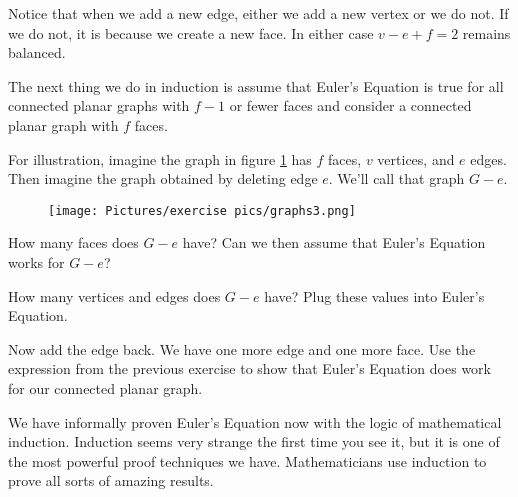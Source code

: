 \vspace{1in}

\noindent Notice that when we add a new edge, either we add a new vertex or we do not. If we do not, it is because we create a new face. In either case $v - e + f = 2$ remains balanced. 

\noindent The next thing we do in induction is assume that Euler’s Equation is true for all connected planar graphs with $f-1$ or fewer faces and consider a connected planar graph with $f$ faces.

\noindent For illustration, imagine the graph in figure \ref{graph3} has $f$ faces, $v$ vertices, and $e$ edges. Then imagine the graph obtained by deleting edge $e$. We’ll call that graph $G-e$.

\begin{figure}[h]
    \centering
    \texttt{[image: Pictures/exercise pics/graphs3.png]}
    \label{graph3}
\end{figure}

\begin{exercise}
How many faces does $G-e$ have? Can we then assume that Euler’s Equation works for $G-e$?
\end{exercise}

\newpage

\begin{exercise}
How many vertices and edges does $G-e$ have? Plug these values into Euler’s Equation.
\end{exercise}

\vspace{1in}

\begin{exercise}
Now add the edge back. We have one more edge and one more face. Use the expression from the previous exercise to show that Euler’s Equation does work for our connected planar graph.
\end{exercise}

\vspace{2in}

\noindent We have informally proven Euler's Equation now with the logic of mathematical induction. Induction seems very strange the first time you see it, but it is one of the most powerful proof techniques we have. Mathematicians use induction to prove all sorts of amazing results.
